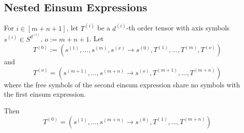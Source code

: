 \subsection{Nested Einsum Expressions}
\begin{theorem}
    For $i \in [m + n + 1]$, let $T^{(i)}$ be a $d^{(i)}$-th order tensor with axis symbols $s^{(i)} \in S^{d^{(i)}}$, $o := m + n + 1$.
    Let
    $$T^{(0)} := (s^{(1)},\dots,s^{(m)}, s^{(x)} \rightarrow s^{(0)}, T^{(1)},\dots,T^{(m)}, T^{(o)})$$
    and
    $$T^{(o)} = (s^{(m + 1)},\dots,s^{(m + n)} \rightarrow s^{(o)}, T^{(m + 1)},\dots,T^{(m + n)})$$
    where the free symbols of the second einsum expression share no symbols with the first einsum expression.

    Then
    $$T^{(0)} = (s^{(1)}, \dots, s^{(m + n)} \rightarrow s^{(0)}, T^{(1)}, \dots, T^{(m + n)})$$
\end{theorem}
